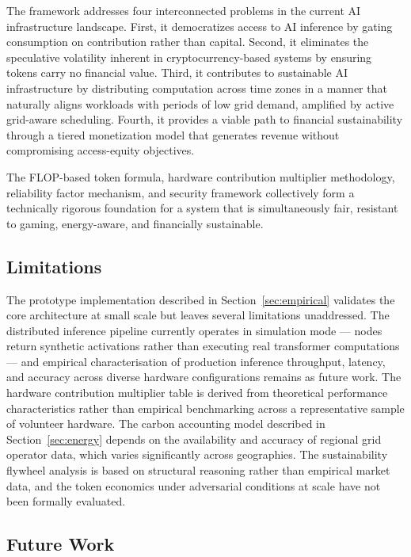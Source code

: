 \documentclass[12pt]{article}
\begin{document}
The framework addresses four interconnected problems in the current AI infrastructure landscape. First, it democratizes access to AI inference by gating consumption on contribution rather than capital. Second, it eliminates the speculative volatility inherent in cryptocurrency-based systems by ensuring tokens carry no financial value. Third, it contributes to sustainable AI infrastructure by distributing computation across time zones in a manner that naturally aligns workloads with periods of low grid demand, amplified by active grid-aware scheduling. Fourth, it provides a viable path to financial sustainability through a tiered monetization model that generates revenue without compromising access-equity objectives.

The FLOP-based token formula, hardware contribution multiplier methodology, reliability factor mechanism, and security framework collectively form a technically rigorous foundation for a system that is simultaneously fair, resistant to gaming, energy-aware, and financially sustainable.

\subsection{Limitations}

The prototype implementation described in Section~\ref{sec:empirical} validates the core architecture at small scale but leaves several limitations unaddressed. The distributed inference pipeline currently operates in simulation mode — nodes return synthetic activations rather than executing real transformer computations — and empirical characterisation of production inference throughput, latency, and accuracy across diverse hardware configurations remains as future work. The hardware contribution multiplier table is derived from theoretical performance characteristics rather than empirical benchmarking across a representative sample of volunteer hardware. The carbon accounting model described in Section~\ref{sec:energy} depends on the availability and accuracy of regional grid operator data, which varies significantly across geographies. The sustainability flywheel analysis is based on structural reasoning rather than empirical market data, and the token economics under adversarial conditions at scale have not been formally evaluated.

\subsection{Future Work}
\end{document}
